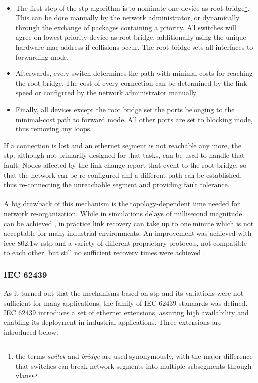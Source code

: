 \begin{itemize}
 \item The first step of the \gls{stp} algorithm is to nominate one device as root bridge\footnote{the terms \textit{switch} and \textit{bridge} are used synonymously,
with the major difference that switches can break network segments into multiple subsegments through \glspl{vlan}}. This can be done manually by the network administrator,
or dynamically through the exchange of packages containing a priority. All switches will agree on lowest priority device as root bridge, additionally using the unique
hardware \gls{mac} address if collisions occur. The root bridge sets all interfaces to forwarding mode. 
 \item Afterwards, every switch determines the path with minimal costs for reaching the root bridge. The cost of every connection can be determined by the link
 speed or configured by the network administrator manually
 \item Finally, all devices except the root bridge set the ports belonging to the minimal-cost path to forward mode. All other ports are set to blocking mode, thus removing
 any loops.
\end{itemize}
If a connection is lost and an ethernet segment is not 
reachable any more, the \gls{stp}, although not primarily designed for that tasks, can be used to handle that fault. Nodes affected by the link-change report
that event to the root bridge, so that the network can be re-configured and a different path can be established, thus re-connecting the unreachable segment
and providing fault tolerance. 
\\
\\
A big drawback of this mechanism is the topology-dependent
time needed for network re-organization. While in simulations delays of millisecond magnitude can be achieved \cite{4447112}, in practice link recovery
can take up to one minute which is not acceptable for many industrial environments. An improvement was achieved with \gls{ieee} 802.1w \gls{rstp} and
a variety of different proprietary protocols, not compatible to each other, but still no sufficient recovery times were achieved \cite{1704183}.

\subsubsection{IEC 62439}

As it turned out that the mechanisms based on \gls{stp} and its variations were not 
sufficient for many applications, the family of IEC 62439 standards was defined. IEC 62439 introduces a set of ethernet extensions, assuring high availability
and enabling its deployment in industrial applications. Three extensions are introduced below.


